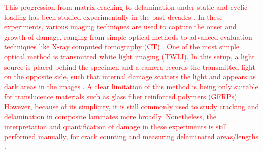 \documentclass[final,5p,times]{elsarticle}
\newcommand{\revision}[1]{\textcolor{red}{#1}}
\begin{document}
	\revision{This progression from matrix cracking to delamination under static and cyclic loading has been studied experimentally in the past decades \cite{kimExperimentalAnalyticalStudies1984, nairnInitiationGrowthDelaminations1992, takedaInitiationGrowthDelamination1994, gludAutomatedCountingOffaxis2016, carraroCharacterisationAnalysisTransverse2019, liUnfoldingEarlyFatigue2020, quinlanAssessmentFatigueDamage2023}.  In these experiments, various imaging techniques are used to capture the onset and growth of damage, ranging from simple optical methods \cite{berthelotTransverseCrackingDelamination2003, garrettMultipleTransverseFracture1977, gludAutomatedCountingOffaxis2016, mehdikhaniMultiscaleDigitalImage2018, drvodericComparingCrackDensity2023, olesenMatrixCraCSAutomatedTracking2024} to advanced evaluation techniques like X-ray computed tomography (CT) \cite{hufenbachTestDeviceDamage2012, sketAutomaticQuantificationMatrix2014, garceaXrayComputedTomography2018, aiStressFieldDamage2021}. One of the most simple optical method is transmitted white light imaging (TWLI). In this setup, a light source is placed behind the specimen and a camera records the transmitted light on the opposite side, such that internal damage scatters the light and appears as dark areas in the images \cite{garrettMultipleTransverseFracture1977, berthelotTransverseCrackingDelamination2003, gludAutomatedCountingOffaxis2016, quinlanAssessmentFatigueDamage2023}. A clear limitation of this method is being only suitable for translucence materials such as glass fiber reinforced polymers (GFRPs). However, because of its simplicity, it is still commonly used to study cracking and delamination in composite laminates more broadly. Nonetheless, the interpretation and quantification of damage in these experiments is still performed manually, for crack counting \cite{addenStiffnessDegradationFatigue2010, bogerImprovementFatigueLife2010, quaresiminDamageEvolutionCyclic2014, kalteremidouInfluenceDifferentLayUp2021} and measuring delaminated areas/lengths \cite{takedaInitiationGrowthDelamination1994, kalteremidouInfluenceDifferentLayUp2021}. }
	
\end{document}

